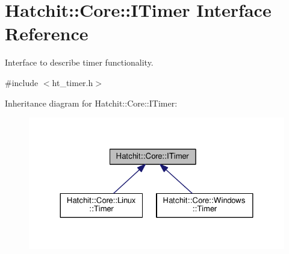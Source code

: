 \hypertarget{classHatchit_1_1Core_1_1ITimer}{}\section{Hatchit\+:\+:Core\+:\+:I\+Timer Interface Reference}
\label{classHatchit_1_1Core_1_1ITimer}


Interface to describe timer functionality.  




{\ttfamily \#include $<$ht\+\_\+timer.\+h$>$}



Inheritance diagram for Hatchit\+:\+:Core\+:\+:I\+Timer\+:
\nopagebreak
\begin{figure}[H]
\begin{center}
\leavevmode
\includegraphics[width=324pt]{classHatchit_1_1Core_1_1ITimer__inherit__graph}
\end{center}
\end{figure}
